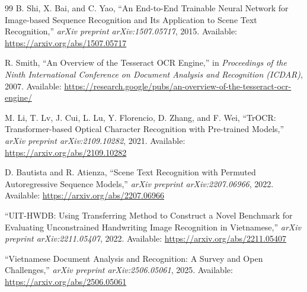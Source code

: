 \documentclass[12pt,a4paper]{article}
\begin{document}
\begin{thebibliography}{99}
B. Shi, X. Bai, and C. Yao,
\newblock ``An End-to-End Trainable Neural Network for Image-based Sequence Recognition and Its Application to Scene Text Recognition,''
\newblock \emph{arXiv preprint arXiv:1507.05717}, 2015.
\newblock Available: \url{https://arxiv.org/abs/1507.05717}

R. Smith,
\newblock ``An Overview of the Tesseract OCR Engine,''
\newblock in \emph{Proceedings of the Ninth International Conference on Document Analysis and Recognition (ICDAR)}, 2007.
\newblock Available: \url{https://research.google/pubs/an-overview-of-the-tesseract-ocr-engine/}

M. Li, T. Lv, J. Cui, L. Lu, Y. Florencio, D. Zhang, and F. Wei,
\newblock ``TrOCR: Transformer-based Optical Character Recognition with Pre-trained Models,''
\newblock \emph{arXiv preprint arXiv:2109.10282}, 2021.
\newblock Available: \url{https://arxiv.org/abs/2109.10282}

D. Bautista and R. Atienza,
\newblock ``Scene Text Recognition with Permuted Autoregressive Sequence Models,''
\newblock \emph{arXiv preprint arXiv:2207.06966}, 2022.
\newblock Available: \url{https://arxiv.org/abs/2207.06966}

\newblock ``UIT-HWDB: Using Transferring Method to Construct a Novel Benchmark for Evaluating Unconstrained Handwriting Image Recognition in Vietnamese,''
\newblock \emph{arXiv preprint arXiv:2211.05407}, 2022.
\newblock Available: \url{https://arxiv.org/abs/2211.05407}

\newblock ``Vietnamese Document Analysis and Recognition: A Survey and Open Challenges,''
\newblock \emph{arXiv preprint arXiv:2506.05061}, 2025.
\newblock Available: \url{https://arxiv.org/abs/2506.05061}
\end{thebibliography}
\end{document}

